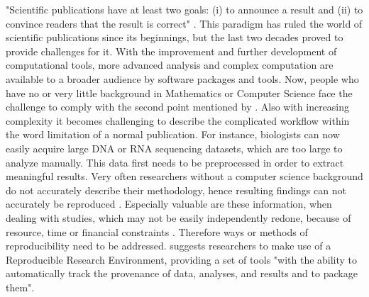 "Scientific publications have at least two goals: (i) to announce a result and (ii) to convince readers that the result is correct" \citep{Mesirov2010}.
This paradigm has ruled the world of scientific publications since its beginnings, but the last two decades proved to provide challenges for it. With the improvement and further development of computational tools, more advanced analysis and complex computation  are available to a broader audience by software packages and tools. Now, people who have no or very little background in Mathematics or Computer Science face the challenge to comply with the second point mentioned by \citeauthor{Mesirov2010}. Also with increasing complexity it becomes challenging to describe the complicated workflow within the word limitation of a normal publication.
For instance, biologists can now easily acquire large DNA or RNA sequencing datasets, which  are too large to analyze manually.
This data first needs to be preprocessed in order to extract meaningful results. %
Very often researchers without a computer science background do not accurately describe their methodology, hence resulting findings can not accurately be reproduced \citep{Peng2011}.
Especially valuable are these information, when dealing with studies, which may not be easily independently redone, because of resource, time or financial constraints \citep{Peng2011}.
 
Therefore ways or methods of reproducibility need to be  addressed. \citeauthor{Mesirov2010} suggests researchers to make use of a Reproducible Research Environment, providing a set of tools "with the ability to automatically track the provenance of data, analyses, and results and to package them".

